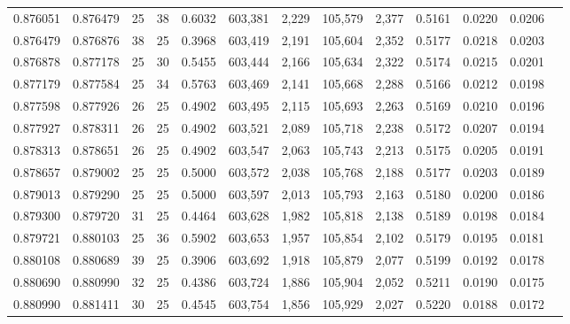 \begin{tabular}{rrrrrrrrrrrrr}
0.876051 & 0.876479 &    25 &  38 &                                     0.6032 & 603,381 &   2,229 & 105,579 &   2,377 & 0.5161 & 0.0220 & 0.0206 \\
0.876479 & 0.876876 &    38 &  25 &                                     0.3968 & 603,419 &   2,191 & 105,604 &   2,352 & 0.5177 & 0.0218 & 0.0203 \\
0.876878 & 0.877178 &    25 &  30 &                                     0.5455 & 603,444 &   2,166 & 105,634 &   2,322 & 0.5174 & 0.0215 & 0.0201 \\
0.877179 & 0.877584 &    25 &  34 &                                     0.5763 & 603,469 &   2,141 & 105,668 &   2,288 & 0.5166 & 0.0212 & 0.0198 \\
0.877598 & 0.877926 &    26 &  25 &                                     0.4902 & 603,495 &   2,115 & 105,693 &   2,263 & 0.5169 & 0.0210 & 0.0196 \\
0.877927 & 0.878311 &    26 &  25 &                                     0.4902 & 603,521 &   2,089 & 105,718 &   2,238 & 0.5172 & 0.0207 & 0.0194 \\
0.878313 & 0.878651 &    26 &  25 &                                     0.4902 & 603,547 &   2,063 & 105,743 &   2,213 & 0.5175 & 0.0205 & 0.0191 \\
0.878657 & 0.879002 &    25 &  25 &                                     0.5000 & 603,572 &   2,038 & 105,768 &   2,188 & 0.5177 & 0.0203 & 0.0189 \\
0.879013 & 0.879290 &    25 &  25 &                                     0.5000 & 603,597 &   2,013 & 105,793 &   2,163 & 0.5180 & 0.0200 & 0.0186 \\
0.879300 & 0.879720 &    31 &  25 &                                     0.4464 & 603,628 &   1,982 & 105,818 &   2,138 & 0.5189 & 0.0198 & 0.0184 \\
0.879721 & 0.880103 &    25 &  36 &                                     0.5902 & 603,653 &   1,957 & 105,854 &   2,102 & 0.5179 & 0.0195 & 0.0181 \\
0.880108 & 0.880689 &    39 &  25 &                                     0.3906 & 603,692 &   1,918 & 105,879 &   2,077 & 0.5199 & 0.0192 & 0.0178 \\
0.880690 & 0.880990 &    32 &  25 &                                     0.4386 & 603,724 &   1,886 & 105,904 &   2,052 & 0.5211 & 0.0190 & 0.0175 \\
0.880990 & 0.881411 &    30 &  25 &                                     0.4545 & 603,754 &   1,856 & 105,929 &   2,027 & 0.5220 & 0.0188 & 0.0172 \\

\end{tabular}
